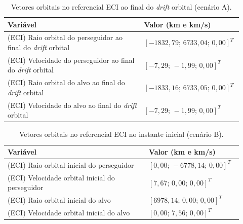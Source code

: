 \begin{table}[H]
\centering
\caption{Vetores orbitais no referencial ECI ao final do \emph{drift} orbital (cenário A).}
\label{tab_cap4_eciA_final}
\begingroup
\small
\setlength{\tabcolsep}{4pt}
\renewcommand{\arraystretch}{1.15}
\begin{tabular}{|p{0.58\linewidth}|p{0.34\linewidth}|}
\hline
Variável & Valor (km e km/s)\\
\hline
(ECI) Raio orbital do perseguidor ao final do \emph{drift} orbital &
$\left[-1832,79;\,6733,04;\,0,00\right]^T$\\
\hline
(ECI) Velocidade do perseguidor ao final do \emph{drift} orbital &
$\left[-7,29;\,-1,99;\,0,00\right]^T$\\
\hline
(ECI) Raio orbital do alvo ao final do \emph{drift} orbital &
$\left[-1833,16;\,6733,05;\,0,00\right]^T$\\
\hline
(ECI) Velocidade do alvo ao final do \emph{drift} orbital &
$\left[-7,29;\,-1,99;\,0,00\right]^T$\\
\hline
\end{tabular}
\endgroup
\end{table}


\begin{table}[H]
\centering
\caption{Vetores orbitais no referencial ECI no instante inicial (cenário B).}
\label{tab_cap4_eciB_inicial}
\begingroup
\small
\setlength{\tabcolsep}{4pt}
\renewcommand{\arraystretch}{1.15}
\begin{tabular}{|p{0.58\linewidth}|p{0.34\linewidth}|}
\hline
Variável & Valor (km e km/s)\\
\hline
(ECI) Raio orbital inicial do perseguidor &
$\left[0,00;\,-6778,14;\,0,00\right]^T$\\
\hline
(ECI) Velocidade orbital inicial do perseguidor &
$\left[7,67;\,0,00;\,0,00\right]^T$\\
\hline
(ECI) Raio orbital inicial do alvo &
$\left[6978,14;\,0,00;\,0,00\right]^T$\\
\hline
(ECI) Velocidade orbital inicial do alvo &
$\left[0,00;\,7,56;\,0,00\right]^T$\\
\hline
\end{tabular}
\endgroup
\end{table}

